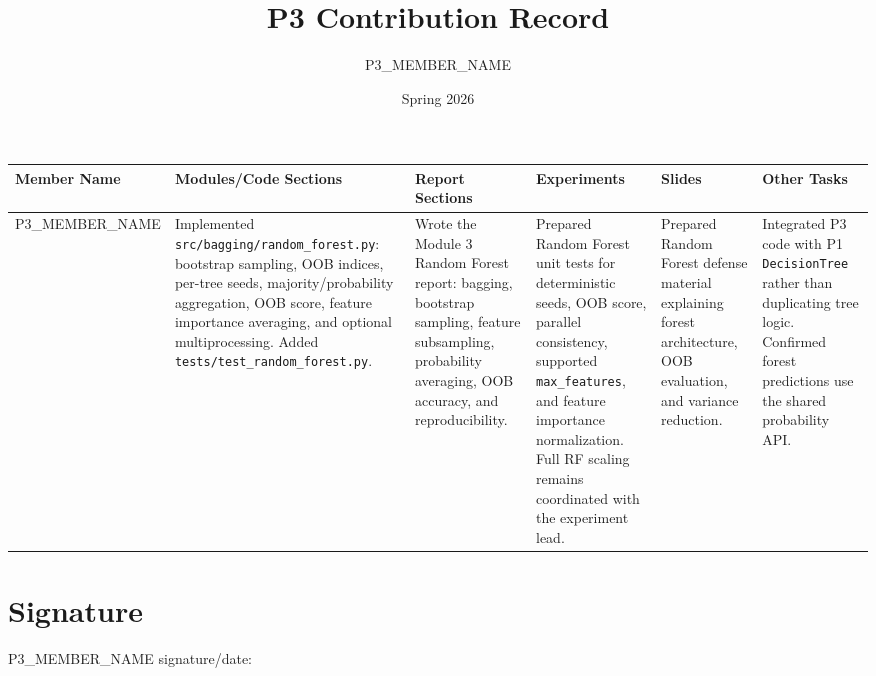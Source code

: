 \documentclass[11pt,a4paper]{article}
\title{P3 Contribution Record}
\author{P3\_MEMBER\_NAME}
\date{Spring 2026}
\begin{document}
\maketitle

\begin{tabularx}{\textwidth}{p{2.5cm} X X X X X}
\toprule
\textbf{Member Name} &
\textbf{Modules/Code Sections} &
\textbf{Report Sections} &
\textbf{Experiments} &
\textbf{Slides} &
\textbf{Other Tasks} \\
\midrule
P3\_MEMBER\_NAME &
Implemented \texttt{src/bagging/random\_forest.py}: bootstrap sampling, OOB
indices, per-tree seeds, majority/probability aggregation, OOB score,
feature importance averaging, and optional multiprocessing. Added
\texttt{tests/test\_random\_forest.py}. &
Wrote the Module 3 Random Forest report: bagging, bootstrap sampling, feature
subsampling, probability averaging, OOB accuracy, and reproducibility. &
Prepared Random Forest unit tests for deterministic seeds, OOB score, parallel
consistency, supported \texttt{max\_features}, and feature importance
normalization. Full RF scaling remains coordinated with the experiment lead. &
Prepared Random Forest defense material explaining forest architecture, OOB
evaluation, and variance reduction. &
Integrated P3 code with P1 \texttt{DecisionTree} rather than duplicating tree
logic. Confirmed forest predictions use the shared probability API. \\
\bottomrule
\end{tabularx}

\section*{Signature}
P3\_MEMBER\_NAME signature/date: \hrulefill
\end{document}
